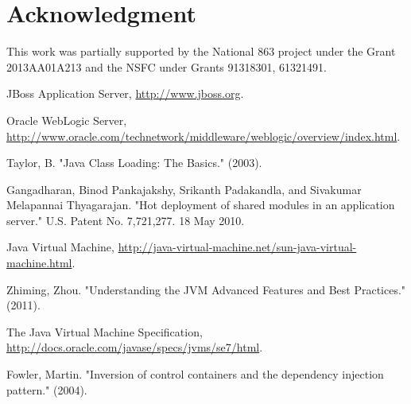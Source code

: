 \documentclass[conference]{IEEEtran}
\begin{document}
\section*{Acknowledgment}
This work was partially supported by the National 863 project under the Grant 2013AA01A213 and the NSFC under Grants 91318301, 61321491.




\begin{thebibliography}{9}


JBoss Application Server, \url{http://www.jboss.org}.

Oracle WebLogic Server, \url{http://www.oracle.com/technetwork/middleware/weblogic/overview/index.html}.


Taylor, B. "Java Class Loading: The Basics." (2003).

Gangadharan, Binod Pankajakshy, Srikanth Padakandla, and Sivakumar Melapannai Thyagarajan. "Hot deployment of shared modules in an application server." U.S. Patent No. 7,721,277. 18 May 2010.



Java Virtual Machine, \url{http://java-virtual-machine.net/sun-java-virtual-machine.html}.

Zhiming, Zhou. "Understanding the JVM Advanced Features and Best Practices." (2011).

The Java Virtual Machine Specification, \url{http://docs.oracle.com/javase/specs/jvms/se7/html}.

Fowler, Martin. "Inversion of control containers and the dependency injection pattern." (2004).


\end{thebibliography}
\end{document}
